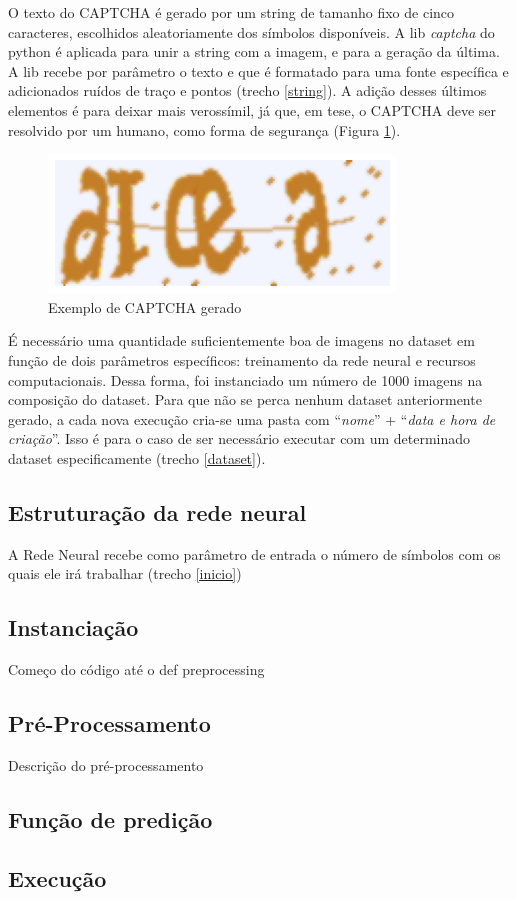 O texto do CAPTCHA é gerado por um string de tamanho fixo de cinco caracteres, escolhidos aleatoriamente dos símbolos disponíveis. A lib \textit{captcha} do python é aplicada para unir a string com a imagem, e para a geração da última. A lib recebe por parâmetro o texto e que é formatado para uma fonte específica e adicionados ruídos de traço e pontos (trecho \ref{string}). A adição desses últimos elementos é para deixar mais verossímil, já que, em tese, o CAPTCHA deve ser resolvido por um humano, como forma de segurança (Figura \ref{fig:captcha}).



\begin{figure}
    \centering
    \includegraphics[scale=0.3]{Relatorio/figuras/captcha.png}
    \caption{Exemplo de CAPTCHA gerado}
    \label{fig:captcha}
\end{figure}

É necessário uma quantidade suficientemente boa de imagens no dataset em função de dois parâmetros específicos: treinamento da rede neural e recursos computacionais. Dessa forma, foi instanciado um número de 1000 imagens na composição do dataset. Para que não se perca nenhum dataset anteriormente gerado, a cada nova execução cria-se uma pasta com ``\textit{nome}'' + ``\textit{data e hora de criação}''. Isso é para o caso de ser necessário executar com um determinado dataset especificamente (trecho \ref{dataset}). 



\subsection{Estruturação da rede neural}

A Rede Neural recebe como parâmetro de entrada o número de símbolos com os quais ele irá trabalhar (trecho \ref{inicio})


\subsection{Instanciação}
Começo do código até o def preprocessing

\subsection{Pré-Processamento}

Descrição do pré-processamento

\subsection{Função de predição}

\subsection{Execução}
